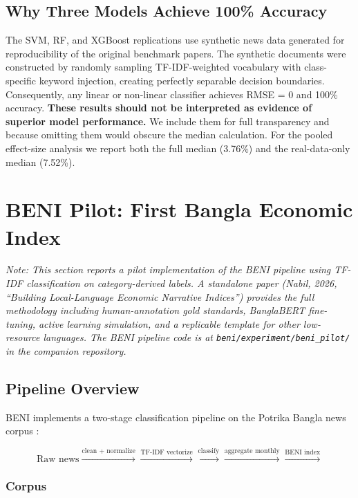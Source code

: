 \documentclass[11pt]{article}
\begin{document}
\subsection{Why Three Models Achieve 100\% Accuracy}

The SVM, RF, and XGBoost replications use synthetic news data generated for reproducibility of the original benchmark papers. The synthetic documents were constructed by randomly sampling TF-IDF-weighted vocabulary with class-specific keyword injection, creating perfectly separable decision boundaries. Consequently, any linear or non-linear classifier achieves RMSE = 0 and 100\% accuracy. \textbf{These results should not be interpreted as evidence of superior model performance.} We include them for full transparency and because omitting them would obscure the median calculation. For the pooled effect-size analysis we report both the full median (3.76\%) and the real-data-only median (7.52\%).

\section{BENI Pilot: First Bangla Economic Index}

\textit{Note: This section reports a pilot implementation of the BENI pipeline using TF-IDF classification on category-derived labels. A standalone paper (Nabil, 2026, ``Building Local-Language Economic Narrative Indices'') provides the full methodology including human-annotation gold standards, BanglaBERT fine-tuning, active learning simulation, and a replicable template for other low-resource languages. The BENI pipeline code is at \texttt{beni/experiment/beni\_pilot/} in the companion repository.}

\subsection{Pipeline Overview}

BENI implements a two-stage classification pipeline on the Potrika Bangla news corpus \citep{Potrika2020}:

\[
\text{Raw news} \xrightarrow{\text{clean + normalize}} \xrightarrow{\text{TF-IDF vectorize}} \xrightarrow{\text{classify}} \xrightarrow{\text{aggregate monthly}} \xrightarrow{\text{BENI index}}
\]

\subsubsection{Corpus}
\end{document}
